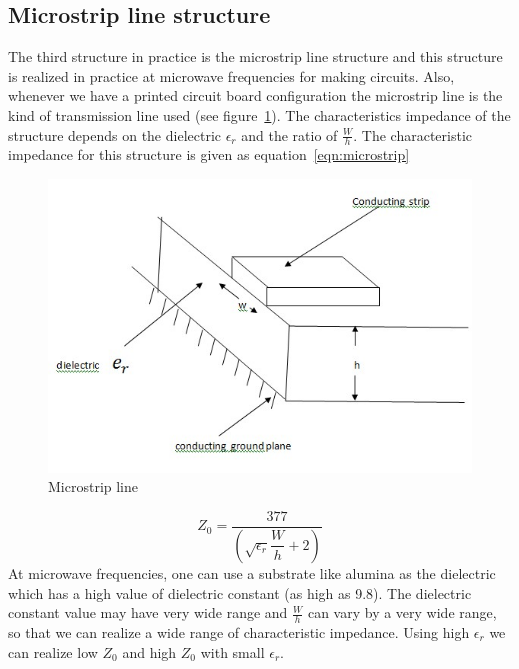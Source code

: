 \subsection{Microstrip line structure}
The third structure in practice is the microstrip line structure and this structure is realized in practice at microwave frequencies for making circuits. Also, whenever we have a printed circuit board configuration the microstrip line is the kind of transmission line used (see figure~\ref{fig:microstrip}). The characteristics impedance of the structure depends on the dielectric $\epsilon_{r}$ and the ratio of $\frac{W}{h}$. The characteristic impedance for this structure is given as equation~\ref{eqn:microstrip}
\begin{figure}[h]
\centering
\includegraphics[width=1\linewidth]{./graphics/microstrip}
\caption{Microstrip line}
\label{fig:microstrip}
\end{figure}

\begin{equation}
Z_0 =\dfrac{377}{\left(\sqrt{\epsilon_r}\dfrac{W}{h}+2\right)}
\label{eqn:microstrip}
\end{equation}
At microwave frequencies, one can use a substrate like alumina as the dielectric which has a high value of dielectric constant (as high as 9.8). The dielectric constant value may have very wide range and $\frac{W}{h}$ can vary by a very wide range, so that we can realize a wide range of characteristic impedance. Using high $\epsilon_r$ we can realize low $Z_0$ and high $Z_0$ with small $\epsilon_r$.

